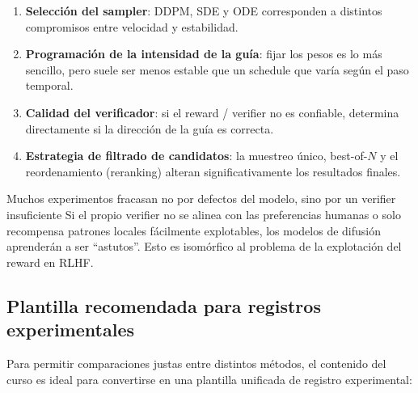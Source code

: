 \documentclass[a4paper]{article}
\begin{document}
\begin{enumerate}
    \item \textbf{Selección del sampler}: DDPM, SDE y ODE corresponden a distintos compromisos entre velocidad y estabilidad.
    \item \textbf{Programación de la intensidad de la guía}: fijar los pesos es lo más sencillo, pero suele ser menos estable que un schedule que varía según el paso temporal.
    \item \textbf{Calidad del verificador}: si el reward / verifier no es confiable, determina directamente si la dirección de la guía es correcta.
    \item \textbf{Estrategia de filtrado de candidatos}: la muestreo único, best-of-$N$ y el reordenamiento (reranking) alteran significativamente los resultados finales.
\end{enumerate}

\begin{importantbox}{Muchos experimentos fracasan no por defectos del modelo, sino por un verifier insuficiente}
Si el propio verifier no se alinea con las preferencias humanas o solo recompensa patrones locales fácilmente explotables, los modelos de difusión aprenderán a ser ``astutos''. Esto es isomórfico al problema de la explotación del reward en RLHF.
\end{importantbox}

\subsection{Plantilla recomendada para registros experimentales}

Para permitir comparaciones justas entre distintos métodos, el contenido del curso es ideal para convertirse en una plantilla unificada de registro experimental:
\end{document}
